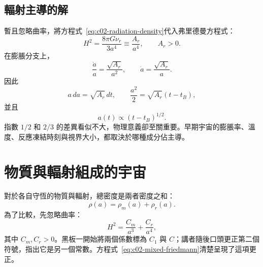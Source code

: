 \begin{classroomqa}
\end{classroomqa}

\begin{classroomqa}
\end{classroomqa}

\subsection{輻射主導的解}

暫且忽略曲率，將方程式~\eqref{eq:c02-radiation-density}代入弗里德曼方程式：
\begin{equation}
H^2=\frac{8\pi G\nu_r}{3a^4}
\equiv\frac{A_r}{a^4},
\qquad A_r>0.
\label{eq:c02-radiation-friedmann}
\end{equation}
在膨脹分支上，
\begin{equation}
\frac{\dot a}{a}=\frac{\sqrt{A_r}}{a^2},
\qquad
\dot a=\frac{\sqrt{A_r}}{a}.
\end{equation}
因此
\begin{equation}
a\,da=\sqrt{A_r}\,dt,
\qquad
\frac{a^2}{2}=\sqrt{A_r}(t-t_B),
\end{equation}
並且
\begin{equation}
\boxed{a(t)\propto(t-t_B)^{1/2}.}
\label{eq:c02-radiation-law}
\end{equation}
指數 \(1/2\) 和 \(2/3\) 的差異看似不大，物理意義卻至關重要。早期宇宙的膨脹率、溫度、反應凍結時刻與視界大小，都取決於哪種成分佔主導。

\section{物質與輻射組成的宇宙}

對於各自守恆的物質與輻射，總密度是兩者密度之和：
\begin{equation}
\rho(a)=\rho_m(a)+\rho_r(a).
\end{equation}
為了比較，先忽略曲率：
\begin{equation}
\boxed{H^2=\frac{C_m}{a^3}+\frac{C_r}{a^4},}
\label{eq:c02-mixed-friedmann}
\end{equation}
其中 \(C_m,C_r>0\)。黑板一開始將兩個係數標為 \(C_1\) 與 \(C\)；講者隨後口頭更正第二個符號，指出它是另一個常數。方程式~\eqref{eq:c02-mixed-friedmann}清楚呈現了這項更正。

